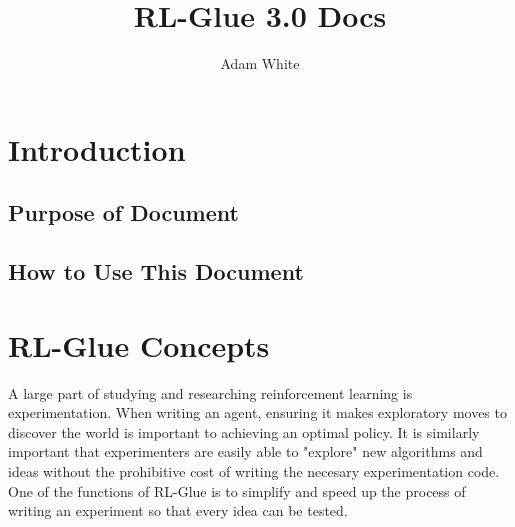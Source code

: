 \documentclass[11pt]{article}
\title{RL-Glue 3.0 Docs}
\author{Adam White}
\begin{document}
\maketitle
\tableofcontents


\section{Introduction}
\subsection{Purpose of Document}
\subsection{How to Use This Document}
\section{RL-Glue Concepts}

A large part of studying and researching reinforcement learning is experimentation. When writing an agent, ensuring it makes exploratory moves to discover the world is important to achieving an optimal policy. It is similarly important that experimenters are easily able to "explore" new algorithms and ideas without the prohibitive cost of writing the necesary experimentation code. One of the functions of RL-Glue is to simplify and speed up the process of writing an experiment so that every idea can be tested. 
\end{document}
